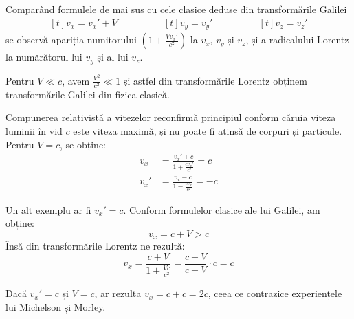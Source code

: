 \documentclass[a4paper, 12pt]{article}
\begin{document}
Comparând formulele de mai sus cu cele clasice deduse din transformările
Galilei
\begin{equation*}
    \begin{aligned}[t]
        v_x = v_x' + V
    \end{aligned}\qquad\qquad
    \begin{aligned}[t]
        v_y = v_y'
    \end{aligned}\qquad\qquad
    \begin{aligned}[t]
        v_z = v_z'
    \end{aligned}
\end{equation*}
se observă apariția numitorului \( \left( 1 + \frac{Vv_x'}{c^2} \right) \) la
$v_x$, $v_y$ și $v_z$, și a radicalului Lorentz la numărătorul lui $v_y$ și al
lui $v_z$.

Pentru \( V \ll c \), avem \( \frac{V^2}{c^2} \ll 1 \) și astfel din
transformările Lorentz obținem transformările Galilei din fizica clasică.

Compunerea relativistă a vitezelor reconfirmă principiul conform căruia viteza
luminii în vid $c$ este viteza maximă, și nu poate fi atinsă de corpuri și
particule. Pentru \( V = c \), se obține:
\begin{equation*}
    \begin{aligned}
        v_x &= \frac{v_x' + c}{1 + \frac{cv_x'}{c^2}} = c \\
        v_x' &= \frac{v_x - c}{1 - \frac{cv_x}{c^2}} = -c
    \end{aligned}
\end{equation*}

Un alt exemplu ar fi \( v_x' = c \). Conform formulelor clasice ale lui Galilei, am obține:
\[ v_x = c + V > c \]
Însă din transformările Lorentz ne rezultă:
\[ v_x = \frac{c + V}{1 + \frac{Vc}{c^2}} = \frac{c + V}{c + V} \cdot c = c \]

Dacă \( v_x' = c \) și \( V = c \), ar rezulta \( v_x = c + c = 2c \), ceea ce contrazice
experiențele lui Michelson și Morley.
\end{document}
